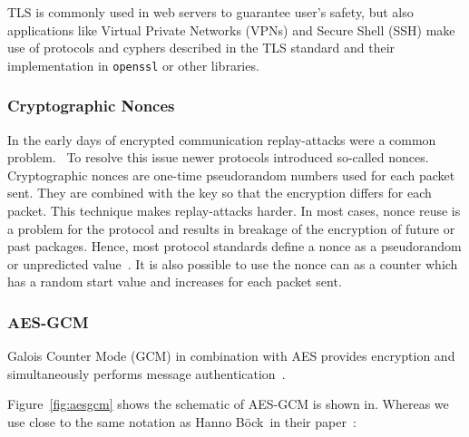TLS is commonly used in web servers to guarantee user's safety, but also
applications like Virtual Private Networks (VPNs) and Secure Shell (SSH) make
use of protocols and cyphers described in the TLS standard and their
implementation in \texttt{openssl} or other libraries.


\subsubsection{Cryptographic Nonces}

In the early days of encrypted communication replay-attacks were a common
problem.~ To resolve this issue newer
protocols introduced so-called nonces. Cryptographic nonces are one-time
pseudorandom numbers used for each packet sent. They are combined with the key
so that the encryption differs for each packet. This technique makes
replay-attacks harder. In most cases, nonce reuse is a problem for the protocol
and results in breakage of the encryption of future or past packages. Hence,
most protocol standards define a nonce as a pseudorandom or unpredicted
value~\cite{noncegeneral}. It is also possible to use the nonce can as a counter
which has a random start value and increases for each packet sent.

\subsubsection{AES-GCM}

Galois Counter Mode (GCM) in combination with AES provides encryption and
simultaneously performs message authentication~\cite{gcm, gcmnist}.

Figure~\ref{fig:aesgcm} shows the schematic of AES-GCM is shown in. Whereas we
use close to the same notation as Hanno Böck~\etal in their
paper~\cite{gcmnonceattack}:

